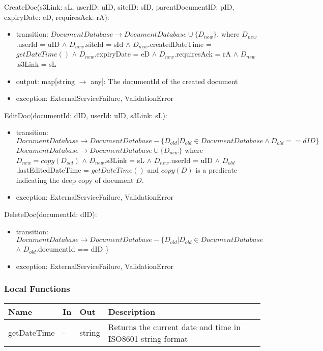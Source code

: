 \documentclass[12pt, titlepage]{article}
\begin{document}
  \noindent CreateDoc(s3Link: sL, userID: uID, siteID: sID,
    parentDocumentID: pID,
  expiryDate: eD, requiresAck: rA):
  \begin{itemize}
    \item transition: $DocumentDatabase \rightarrow DocumentDatabase
      \cup \{D_{new}\}$, where $D_{new}$.userId = uID $\land$ $D_{new}$.siteId =
      sId $\land$ $D_{new}$.createdDateTime = $getDateTime()$ $\land$
      $D_{new}$.expiryDate = eD $\land$
      $D_{new}$.requiresAck = rA $\land$ $D_{new}$.s3Link = sL
    \item output: map[string $\rightarrow$ any]: The documentId of the created
      document
    \item exception: ExternalServiceFailure, ValidationError
  \end{itemize}

  \noindent EditDoc(documentId: dID, userId: uID, s3Link: sL):
  \begin{itemize}
    \item transition: $DocumentDatabase \rightarrow DocumentDatabase - \{D_{old}
      | D_{old} \in DocumentDatabase \land D_{old} == dID\}$\\
      $DocumentDatabase \rightarrow DocumentDatabase \cup
      \{D_{new}\}$ where $D_{new} = copy(D_{old})$ $\land$ $D_{new}$.s3Link = sL
      $\land$ $D_{new}$.userId = uID $\land$
      $D_{old}$.lastEditedDateTime = $getDateTime()$ and $copy(D)$ is
      a predicate indicating the
      deep copy of document $D$.
    \item exception: ExternalServiceFailure, ValidationError
  \end{itemize}

  \noindent DeleteDoc(documentId: dID):
  \begin{itemize}
    \item transition: $DocumentDatabase \rightarrow DocumentDatabase -
      \{D_{old} | D_{old} \in DocumentDatabase$ $\land$
      $D_{old}$.documentId == dID \}
    \item exception: ExternalServiceFailure, ValidationError
  \end{itemize}

  \subsubsection{Local Functions}

  \begin{center}
    \begin{tabular}{>{\raggedright}p{4cm} >{\raggedright}p{3cm}
      >{\raggedright}p{3.5cm} p{5.5cm}}
      \hline
      \textbf{Name} & \textbf{In} & \textbf{Out} & \textbf{Description} \\
      \hline
      getDateTime & - & string & Returns the current date and time in ISO8601
      string format\\
      \hline
    \end{tabular}
  \end{center}
\end{document}
